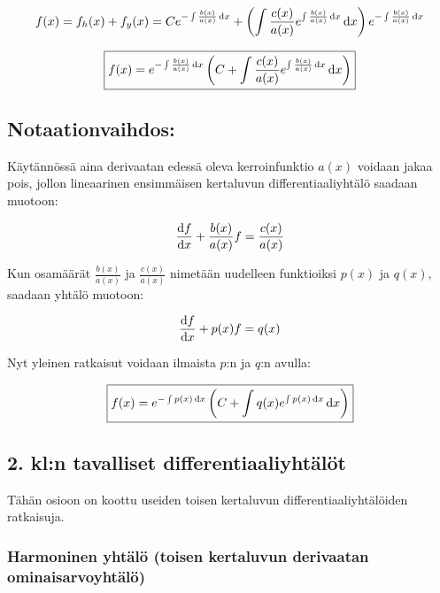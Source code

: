 \documentclass[../johdoksia.tex]{subfiles}
\begin{document}
	\begin{equation*}
		f(x) = f_h(x) + f_y(x) = Ce^{-\int\frac{b(x)}{a(x)}\odif{x}} + \left(\int \frac{c(x)}{a(x)}e^{\int\frac{b(x)}{a(x)}\odif{x}}\odif{x}\right)e^{-\int\frac{b(x)}{a(x)}\odif{x}}
	\end{equation*}
	
	\begin{equation}
		\boxed{f(x) = e^{-\int\frac{b(x)}{a(x)}\odif{x}}\left(C + \int \frac{c(x)}{a(x)}e^{\int\frac{b(x)}{a(x)}\odif{x}}\odif{x}\right)}
	\end{equation}
	
	\subsection{Notaationvaihdos:}
	
	Käytännössä aina derivaatan edessä oleva kerroinfunktio $a(x)$ voidaan jakaa pois, jollon lineaarinen ensimmäisen kertaluvun differentiaaliyhtälö saadaan muotoon:
	
	\begin{equation*}
		\odv{f}{x} + \frac{b(x)}{a(x)}f = \frac{c(x)}{a(x)}
	\end{equation*}
	
	Kun osamäärät $\frac{b(x)}{a(x)}$ ja $\frac{c(x)}{a(x)}$ nimetään uudelleen funktioiksi $p(x)$ ja $q(x)$, saadaan yhtälö muotoon:
	
	\begin{equation}
		\odv{f}{x} + p(x)f = q(x)
	\end{equation}
	
	Nyt yleinen ratkaisut voidaan ilmaista $p$:n ja $q$:n avulla:
	
	\begin{equation}
		\boxed{f(x) = e^{-\int p(x)\odif{x}}\left(C + \int q(x)e^{\int p(x)\odif{x}}\odif{x}\right)}
	\end{equation}
	
	\subsection{2. kl:n tavalliset differentiaaliyhtälöt}
	
	Tähän osioon on koottu useiden toisen kertaluvun differentiaaliyhtälöiden ratkaisuja.
	
	\subsubsection{Harmoninen yhtälö (toisen kertaluvun derivaatan ominaisarvoyhtälö)}
	
\end{document}
